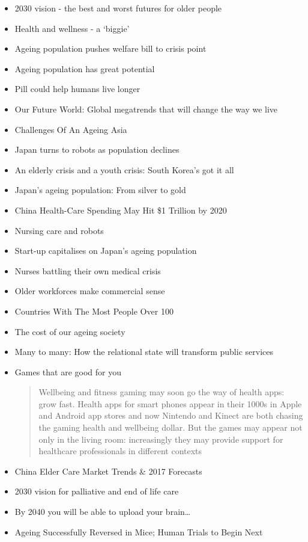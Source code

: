\begin{itemize}
\item 2030 vision - the best and worst futures for older people
\item Health and wellness - a `biggie'
\item Ageing population pushes welfare bill to crisis point
\item Ageing population has great potential
\item Pill could help humans live longer
\item Our Future World: Global megatrends that will change the way we live
\item Challenges Of An Ageing Asia
\item Japan turns to robots as population declines
\item An elderly crisis and a youth crisis: South Korea's got it all
\item Japan's ageing population: From silver to gold
\item China Health-Care Spending May Hit \$1 Trillion by 2020
\item Nursing care and robots
\item Start-up capitalises on Japan's ageing population
\item Nurses battling their own medical crisis
\item Older workforces make commercial sense
\item Countries With The Most People Over 100
\item The cost of our ageing society
\item Many to many: How the relational state will transform public services
\item Games that are good for you
\begin{quotation}
Wellbeing and fitness gaming may soon go the way of health apps: grow fast. Health apps for smart phones appear in their 1000s in Apple and Android app stores and now Nintendo and Kinect are both chasing the gaming health and wellbeing dollar. But the games may appear not only in the living room: increasingly they may provide support for healthcare professionals in different contexts\end{quotation}
\item China Elder Care Market Trends \& 2017 Forecasts
\item 2030 vision for palliative and end of life care
\item By 2040 you will be able to upload your brain\ldots
\item Ageing Successfully Reversed in Mice; Human Trials to Begin Next

\end{itemize}

